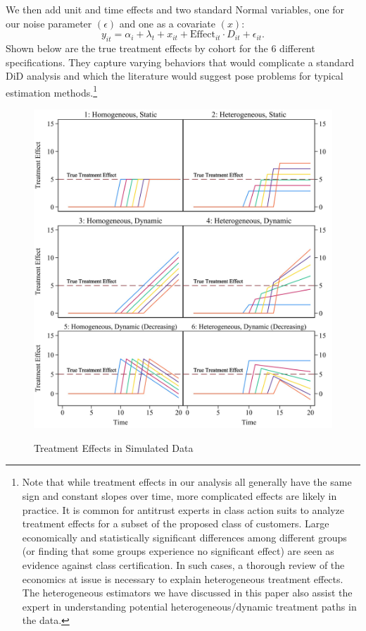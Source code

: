 \documentclass[12pt]{article}
\begin{document}
We then add unit and time effects and two standard Normal variables, one for our noise parameter $(\epsilon)$ and one as a covariate $(x)$:
\begin{equation}
     y_{it} = \alpha_i + \lambda_t + x_{it} + \text{Effect}_{it} \cdot D_{it} + \epsilon_{it}.
\end{equation}
Shown below are the true treatment effects by cohort for the 6 different specifications. They capture varying behaviors that would complicate a standard DiD analysis and which the literature would suggest pose problems for typical estimation methods.\footnote{Note that while treatment effects in our analysis all generally have the same sign and constant slopes over time, more complicated effects are likely in practice. It is common for antitrust experts in class action suits to analyze treatment effects for a subset of the proposed class of customers. Large economically and statistically significant differences among different groups (or finding that some groups experience no significant effect) are seen as evidence against class certification. In such cases, a thorough review of the economics at issue is necessary to explain heterogeneous treatment effects. The heterogeneous estimators we have discussed in this paper also assist the expert in understanding potential heterogeneous/dynamic treatment paths in the data.}
\begin{figure}[H]
    \centering
    \caption{Treatment Effects in Simulated Data}
    \includegraphics[width=5in]{Figures/Table 1 Treatment Effects Chart.jpg}
    \label{fig:treat-effects}
\end{figure}
\end{document}
